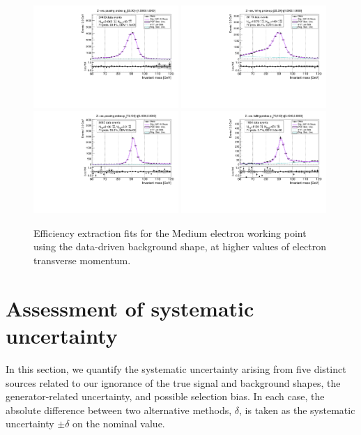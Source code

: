 {\begin{figure}
\centering
\includegraphics[width=0.49\textwidth]{figures/Zee_RecoTemplate_BkgLPiEMu_pass_ptBin3_etaBin23.pdf}
\includegraphics[width=0.49\textwidth]{figures/Zee_RecoTemplate_BkgLPiEMu_fail_ptBin3_etaBin23.pdf}
\includegraphics[width=0.49\textwidth]{figures/Zee_RecoTemplate_BkgLPiEMu_pass_ptBin14_etaBin17.pdf}
\includegraphics[width=0.49\textwidth]{figures/Zee_RecoTemplate_BkgLPiEMu_fail_ptBin14_etaBin17.pdf}
\caption{Efficiency extraction fits for the Medium electron working point using the data-driven background shape, at higher values of electron transverse momentum.}
\label{fig:ZeeNominalFits2}
\end{figure}

\section{Assessment of systematic uncertainty}
\label{sec:tnpsyst}
In this section, we quantify the systematic uncertainty arising from five distinct sources related to our ignorance
of the true signal and background shapes, the generator-related uncertainty, and possible selection bias.
In each case, the absolute difference between two alternative methods, $\delta$, is taken as the systematic uncertainty $\pm\delta$ on the nominal value.

}
